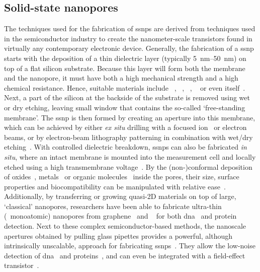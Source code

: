 \subsection{Solid-state nanopores}
%

The techniques used for the fabrication of \glspl{ssnp} are derived from techniques used in the semiconductor
industry to create the nanometer-scale transistors found in virtually any contemporary electronic device.
Generally, the fabrication of a \gls{ssnp} starts with the deposition of a thin dielectric layer (typically
\SIrange{5}{50}{\nm}) on top of a flat silicon substrate. Because this layer will form both the membrane and
the nanopore, it must have both a high mechanical strength and a high chemical resistance. Hence, suitable
materials include ~\cite{Li-2001,Storm-2003}, ~\cite{Storm-2005},
~\cite{Venkatesan-2009}, ~\cite{Larkin-2013} or even 
itself~\cite{Malachowski-2013}. Next, a part of the silicon at the backside of the substrate is removed using
wet or dry etching, leaving small window that contains the so-called `free-standing membrane'. The \gls{ssnp}
is then formed by creating an aperture into this membrane, which can be achieved by either \textit{ex situ}
drilling with a focused ion~\cite{Li-2001} or electron~\cite{Storm-2003} beams, or by electron-beam
lithography patterning in combination with wet/dry etching~\cite{Nam-2009}. With controlled dielectric
breakdown, \glspl{ssnp} can also be fabricated \textit{in situ}, where an intact membrane is mounted into the
measurement cell and locally etched using a high transmembrane voltage~\cite{Kwok-2014}. By the
(non-)conformal deposition of oxides~\cite{Chen-2004}, metals~\cite{Li-2013d,Auger-2014,Spitzberg-2019} or
organic molecules~\cite{Wanunu-2007,Yusko-2011,Wei-2012,Rotem-2012} inside the pores, their size, surface
properties and biocompatibility can be manipulated with relative ease~\cite{Eggenberger-2019}. Additionally,
by transferring or growing quasi-2D materials on top of large, `classical' nanopores, researchers have been
able to fabricate ultra-thin (\ie~monoatomic) nanopores from graphene~\cite{Fischbein-2008} and
~\cite{Feng-2015b} for both \gls{dna}~\cite{Feng-2015,Merchant-2010,Song-2011} and
protein~\cite{Shan-2013} detection. Next to these complex semiconductor-based methods, the nanoscale apertures
obtained by pulling glass pipettes provides a powerful, although intrinsically unscalable, approach for
fabricating \glspl{ssnp}~\cite{Wang-2006}. They allow the low-noise detection of
\gls{dna}~\cite{Steinbock-2013} and proteins~\cite{Li-2013B}, and can even be integrated with a field-effect
transistor~\cite{Ren-2020}.


